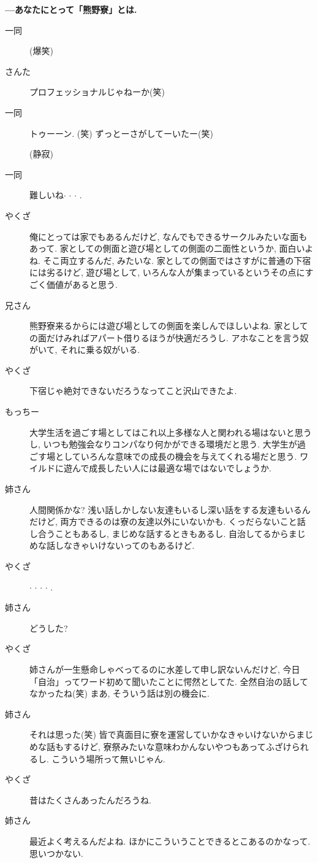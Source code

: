 \documentclass[10pt,b5jsbook,dvips,dvipdfmx,openany]{jsbook}
\theoremstyle{definition}
\begin{document}
\begin{multicols}{2}
		\textbf{---あなたにとって「熊野寮」とは. }
		\begin{description}
		\item[ 一同 ](爆笑)
		\item[さんた]プロフェッショナルじゃねーか(笑)
		\item[ 一同 ]トゥーーン. (笑) ずっとーさがしてーいたー(笑)

		(静寂)
		
		\item[ 一同 ]難しいね$ \cdot $ $ \cdot $ $ \cdot $ . 
		\item[やくざ]俺にとっては家でもあるんだけど, なんでもできるサークルみたいな面もあって. 家としての側面と遊び場としての側面の二面性というか, 面白いよね. そこ両立するんだ, みたいな. 家としての側面ではさすがに普通の下宿には劣るけど, 遊び場として, いろんな人が集まっているというその点にすごく価値があると思う. 
		\item[兄さん]熊野寮来るからには遊び場としての側面を楽しんでほしいよね. 家としての面だけみればアパート借りるほうが快適だろうし. アホなことを言う奴がいて, それに乗る奴がいる. 
		\item[やくざ]下宿じゃ絶対できないだろうなってこと沢山できたよ. 
		\item[もっちー]大学生活を過ごす場としてはこれ以上多様な人と関われる場はないと思うし, いつも勉強会なりコンパなり何かができる環境だと思う. 大学生が過ごす場としていろんな意味での成長の機会を与えてくれる場だと思う. ワイルドに遊んで成長したい人には最適な場ではないでしょうか. 
		\item[姉さん]人間関係かな? 浅い話しかしない友達もいるし深い話をする友達もいるんだけど, 両方できるのは寮の友達以外にいないかも. くっだらないこと話し合うこともあるし, まじめな話するときもあるし. 自治してるからまじめな話しなきゃいけないってのもあるけど. 
		\item[やくざ]$ \cdot $ $ \cdot $ $ \cdot $ $ \cdot $ . 
		\item[姉さん]どうした? 
		\item[やくざ]姉さんが一生懸命しゃべってるのに水差して申し訳ないんだけど, 今日「自治」ってワード初めて聞いたことに愕然としてた. 全然自治の話してなかったね(笑) まあ, そういう話は別の機会に. 
		\item[姉さん]それは思った(笑) 皆で真面目に寮を運営していかなきゃいけないからまじめな話もするけど, 寮祭みたいな意味わかんないやつもあってふざけられるし. こういう場所って無いじゃん. 
		\item[やくざ]昔はたくさんあったんだろうね. 
		\item[姉さん]最近よく考えるんだよね. ほかにこういうことできるとこあるのかなって. 思いつかない. 

\end{description}
\end{multicols}
\end{document}
